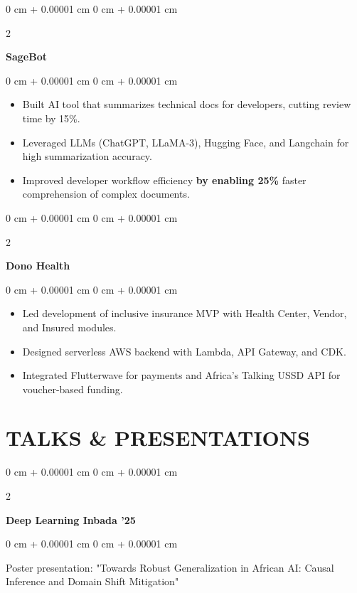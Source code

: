 \documentclass[11pt, letterpaper]{article}
\newenvironment{onecolentry}{
    \begin{adjustwidth}{
        0 cm + 0.00001 cm
    }{
        0 cm + 0.00001 cm
    }
}{
    \end{adjustwidth}
} %
\newenvironment{twocolentry}[2][]{
    \onecolentry
    \def\secondColumn{#2}
    \setcolumnwidth{\fill, 4.5 cm}
    \begin{paracol}{2}
}{
    \switchcolumn \raggedleft \secondColumn
    \end{paracol}
    \endonecolentry
} %
\begin{document}
        \vspace{0.50 cm}
        \begin{twocolentry}{
            
        }
            \textbf{SageBot}
        \end{twocolentry}
        \begin{onecolentry}
            \begin{itemize}
                \item[-] Built AI tool that summarizes technical docs for developers, cutting review time by 15\%.
                \item[-] Leveraged LLMs (ChatGPT, LLaMA-3), Hugging Face, and Langchain for high summarization accuracy.
                \item[-] Improved developer workflow efficiency\textbf{ by enabling 25\%} faster comprehension of complex documents.
            \end{itemize}
        \end{onecolentry}

        \begin{twocolentry}{
            
        }
            \textbf{Dono Health}
        \end{twocolentry}
        \begin{onecolentry}
            \begin{itemize}
                \item[-] Led development of inclusive insurance MVP with Health Center, Vendor, and Insured modules.
                \item[-] Designed serverless AWS backend with Lambda, API Gateway, and CDK.
                \item[-] Integrated Flutterwave for payments and Africa's Talking USSD API for voucher-based funding.
            \end{itemize}
        \end{onecolentry}

    \section{TALKS \& PRESENTATIONS}
        \begin{twocolentry}{
            2025
        }
            \textbf{Deep Learning Inbada '25}
        \end{twocolentry}
        \begin{onecolentry}
            Poster presentation: "Towards Robust Generalization in African AI: Causal Inference and Domain Shift Mitigation"
        \end{onecolentry}
        
\end{document}
